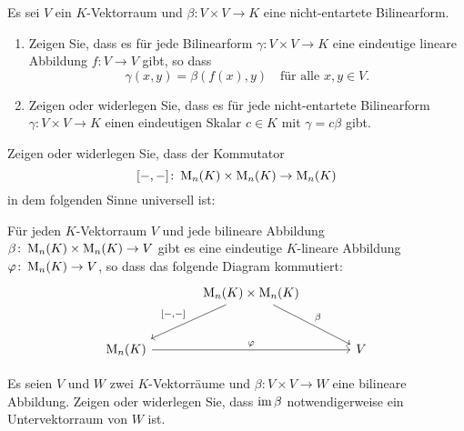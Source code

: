 \documentclass[a4paper,10pt]{scrartcl}
\begin{document}
\begin{question}
  Es sei $V$ ein $K$-Vektorraum und $\beta \colon V \times V \to K$ eine nicht-entartete Bilinearform.
  \begin{enumerate}
    \item
      Zeigen Sie, dass es für jede Bilinearform $\gamma \colon V \times V \to K$ eine eindeutige lineare Abbildung $f \colon V \to V$ gibt, so dass
      \[
        \gamma(x,y) = \beta(f(x), y)
        \quad
        \text{für alle $x,y \in V$}.
      \]
    \item
      Zeigen oder widerlegen Sie, dass es für jede nicht-entartete Bilinearform $\gamma \colon V \times V \to K$ einen eindeutigen Skalar $c \in K$ mit $\gamma = c \beta$ gibt.
  \end{enumerate}
\end{question}


\begin{question}
  Zeigen oder widerlegen Sie, dass der Kommutator
  \[
    [-, -] \colon \operatorname{M}_n(K) \times \operatorname{M}_n(K) \to \operatorname{M}_n(K)
  \]
  in dem folgenden Sinne universell ist:
  
  Für jeden $K$-Vektorraum $V$ und jede bilineare Abbildung \mbox{$\beta \colon \operatorname{M}_n(K) \times \operatorname{M}_n(K) \to V$} gibt es eine eindeutige $K$-lineare Abbildung $\varphi \colon \operatorname{M}_n(K) \to V$, so dass das folgende Diagram kommutiert:
  \[
    \begin{tikzcd}[row sep = large, column sep = large, ampersand replacement = \&]
            {}
        \&  \Mat_n(K) \times \Mat_n(K)  \arrow{rd}{\beta}
                                        \arrow[swap]{ld}{[-,-]}
        \&  {}
      \\
            \Mat_n(K)                   \arrow{rr}{\varphi}
        \&  {}
        \&  V
    \end{tikzcd}
  \]
\end{question}


\begin{question}
  Es seien $V$ und $W$ zwei $K$-Vektorräume und $\beta \colon V \times V \to W$ eine bilineare Abbildung.
  Zeigen oder widerlegen Sie, dass $\operatorname{im} \beta$ notwendigerweise ein Untervektorraum von $W$ ist.
\end{question}
\end{document}
